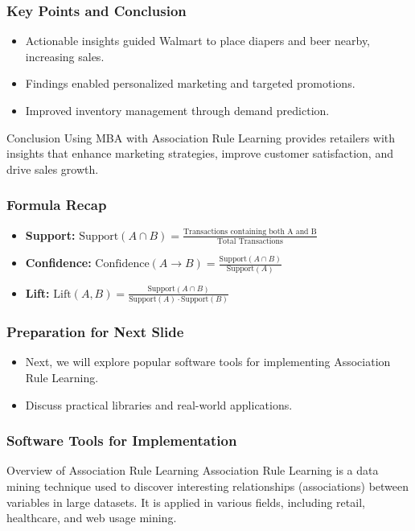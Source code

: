 \documentclass[aspectratio=169]{beamer}
\begin{document}
\begin{frame}[fragile]
    \frametitle{Key Points and Conclusion}
    \begin{itemize}
        \item Actionable insights guided Walmart to place diapers and beer nearby, increasing sales.
        \item Findings enabled personalized marketing and targeted promotions.
        \item Improved inventory management through demand prediction.
    \end{itemize}

    \begin{block}{Conclusion}
        Using MBA with Association Rule Learning provides retailers with insights that enhance marketing strategies, improve customer satisfaction, and drive sales growth.
    \end{block}
\end{frame}

\begin{frame}[fragile]
    \frametitle{Formula Recap}
    \begin{itemize}
        \item \textbf{Support:} \( \text{Support}(A \cap B) = \frac{\text{Transactions containing both A and B}}{\text{Total Transactions}} \)
        \item \textbf{Confidence:} \( \text{Confidence}(A \to B) = \frac{\text{Support}(A \cap B)}{\text{Support}(A)} \)
        \item \textbf{Lift:} \( \text{Lift}(A, B) = \frac{\text{Support}(A \cap B)}{\text{Support}(A) \cdot \text{Support}(B)} \)
    \end{itemize}
\end{frame}

\begin{frame}[fragile]
    \frametitle{Preparation for Next Slide}
    \begin{itemize}
        \item Next, we will explore popular software tools for implementing Association Rule Learning.
        \item Discuss practical libraries and real-world applications.
    \end{itemize}
\end{frame}

\begin{frame}
    \frametitle{Software Tools for Implementation}
    \begin{block}{Overview of Association Rule Learning}
        Association Rule Learning is a data mining technique used to discover interesting relationships (associations) between variables in large datasets. It is applied in various fields, including retail, healthcare, and web usage mining.
    \end{block}
\end{frame}
\end{document}
